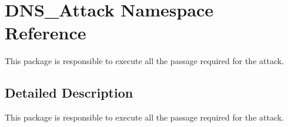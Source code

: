 \hypertarget{namespaceDNS__Attack}{}\section{D\+N\+S\+\_\+\+Attack Namespace Reference}
\label{namespaceDNS__Attack}


This package is responsible to execute all the passage required for the attack.  




\subsection{Detailed Description}
This package is responsible to execute all the passage required for the attack. 